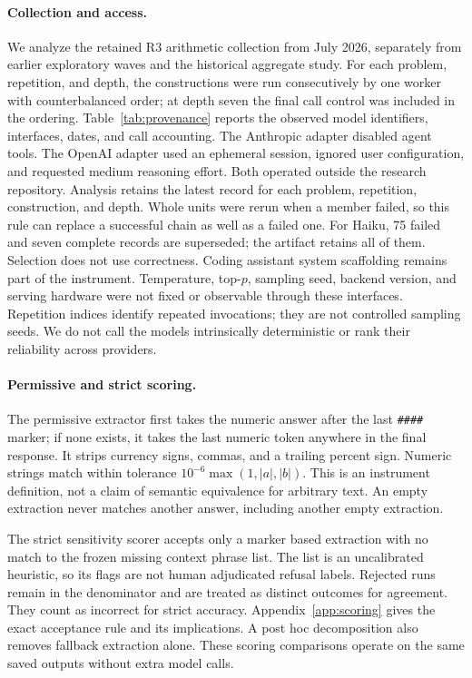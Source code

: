 \documentclass{article}
\begin{document}
\paragraph{Collection and access.}
We analyze the retained R3 arithmetic collection from July 2026, separately from earlier exploratory waves and the historical aggregate study. For each problem, repetition, and depth, the constructions were run consecutively by one worker with counterbalanced order; at depth seven the final call control was included in the ordering. Table~\ref{tab:provenance} reports the observed model identifiers, interfaces, dates, and call accounting. The Anthropic adapter disabled agent tools. The OpenAI adapter used an ephemeral session, ignored user configuration, and requested medium reasoning effort. Both operated outside the research repository. Analysis retains the latest record for each problem, repetition, construction, and depth. Whole units were rerun when a member failed, so this rule can replace a successful chain as well as a failed one. For Haiku, 75 failed and seven complete records are superseded; the artifact retains all of them. Selection does not use correctness. Coding assistant system scaffolding remains part of the instrument. Temperature, top-$p$, sampling seed, backend version, and serving hardware were not fixed or observable through these interfaces. Repetition indices identify repeated invocations; they are not controlled sampling seeds. We do not call the models intrinsically deterministic or rank their reliability across providers.



\paragraph{Permissive and strict scoring.}
The permissive extractor first takes the numeric answer after the last \texttt{\#\#\#\#} marker; if none exists, it takes the last numeric token anywhere in the final response. It strips currency signs, commas, and a trailing percent sign. Numeric strings match within tolerance $10^{-6}\max(1,|a|,|b|)$. This is an instrument definition, not a claim of semantic equivalence for arbitrary text. An empty extraction never matches another answer, including another empty extraction.

The strict sensitivity scorer accepts only a marker based extraction with no match to the frozen missing context phrase list. The list is an uncalibrated heuristic, so its flags are not human adjudicated refusal labels. Rejected runs remain in the denominator and are treated as distinct outcomes for agreement. They count as incorrect for strict accuracy. Appendix~\ref{app:scoring} gives the exact acceptance rule and its implications. A post hoc decomposition also removes fallback extraction alone. These scoring comparisons operate on the same saved outputs without extra model calls.
\end{document}
